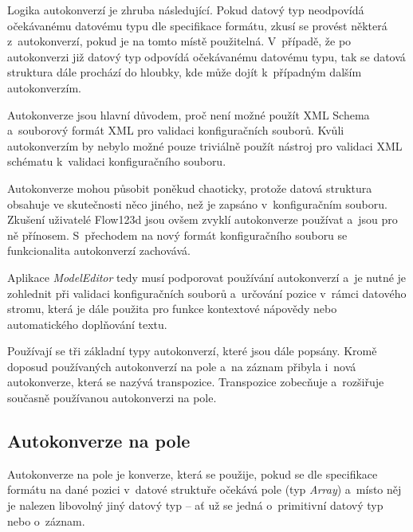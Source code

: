 \documentclass[FM,bw,DP]{tulthesis}
\begin{document}
Logika autokonverzí je zhruba následující. Pokud datový typ neodpovídá o\-če\-ká\-va\-né\-mu datovému typu dle specifikace formátu, zkusí se provést některá z~autokonverzí, pokud je na tomto místě použitelná. V~případě, že po autokonverzi již datový typ odpovídá očekávanému datovému typu, tak se datová struktura dále prochází do hloubky, kde může dojít k~případným dalším autokonverzím.

Autokonverze jsou hlavní důvodem, proč není možné použít \gls{XML} Schema a~souborový formát \gls{XML} pro validaci konfiguračních souborů. Kvůli autokonverzím by nebylo možné pouze triviálně použít nástroj pro validaci \gls{XML} schématu k~validaci konfiguračního souboru.

Autokonverze mohou působit poněkud chaoticky, protože datová struktura obsahuje ve skutečnosti něco jiného, než je zapsáno v~konfiguračním souboru. Zkušení uživatelé Flow123d jsou ovšem zvyklí autokonverze používat a~jsou pro ně přínosem. S~přechodem na nový formát konfiguračního souboru se funkcionalita autokonverzí zachovává.

Aplikace \textit{ModelEditor} tedy musí podporovat používání autokonverzí a~je nutné je zohlednit při validaci konfiguračních souborů a~určování pozice v~rámci datového stromu, která je dále použita pro funkce kontextové nápovědy nebo automatického doplňování textu. 

Používají se tři základní typy autokonverzí, které jsou dále popsány. Kromě doposud používaných autokonverzí na pole a~na záznam přibyla i~nová autokonverze, která se nazývá transpozice. Transpozice zobecňuje a~rozšiřuje současně používanou autokonverzi na pole.

\subsection{Autokonverze na pole}
\label{sec:analyza-autokonverze-pole}

\lstset{style=short}

Autokonverze na pole je konverze, která se použije, pokud se dle specifikace formátu na dané pozici v~datové struktuře očekává pole (typ \textit{Array}) a~místo něj je nalezen libovolný jiný datový typ -- ať už se jedná o~primitivní datový typ nebo o~záznam.
\end{document}
